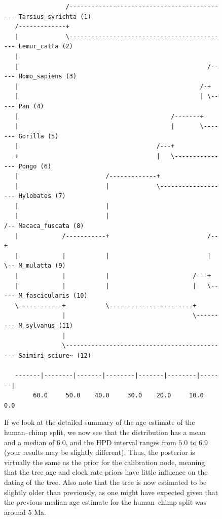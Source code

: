 \documentclass[12pt]{book}
\begin{document}
\begin{figure}[h]
\scriptsize
\begin{singlespacing}
\begin{verbatim}
                 /-------------------------------------------- Tarsius_syrichta (1)
   /-------------+                                                                 
   |             \-------------------------------------------- Lemur_catta (2)
   |                                                                               
   |                                                    /----- Homo_sapiens (3)
   |                                                  /-+                          
   |                                                  | \----- Pan (4)
   |                                          /-------+                            
   |                                          |       \------- Gorilla (5)
   |                                      /---+                                    
   +                                      |   \--------------- Pongo (6)
   |                        /-------------+                                        
   |                        |             \------------------- Hylobates (7)
   |                        |                                                      
   |                        |                              /-- Macaca_fuscata (8)
   |            /-----------+                           /--+                       
   |            |           |                           |  \-- M_mulatta (9)
   |            |           |                       /---+                          
   |            |           |                       |   \----- M_fascicularis (10)
   \------------+           \-----------------------+                              
                |                                   \--------- M_sylvanus (11)
                |                                                                  
                \--------------------------------------------- Saimiri_sciure~ (12)
                                                                                   
   -------|--------|-------|--------|-------|--------|-------|                     
        60.0     50.0    40.0     30.0    20.0     10.0     0.0                    
\end{verbatim}
\end{singlespacing}
\normalsize

If we look at the detailed summary of the age estimate of the human--chimp split, we now see that
the distribution has a mean and a median of $6.0$, and the HPD interval ranges from $5.0$ to $6.9$
(your results may be slightly different). Thus, the posterior is virtually the same as the prior
for the calibration node, meaning that the tree age and clock rate priors have little influence on
the dating of the tree. Also note that the tree is now estimated to be slightly older than
previously, as one might have expected given that the previous median age estimate for the
human--chimp split was around $5$ Ma.


\end{figure}
\end{document}
